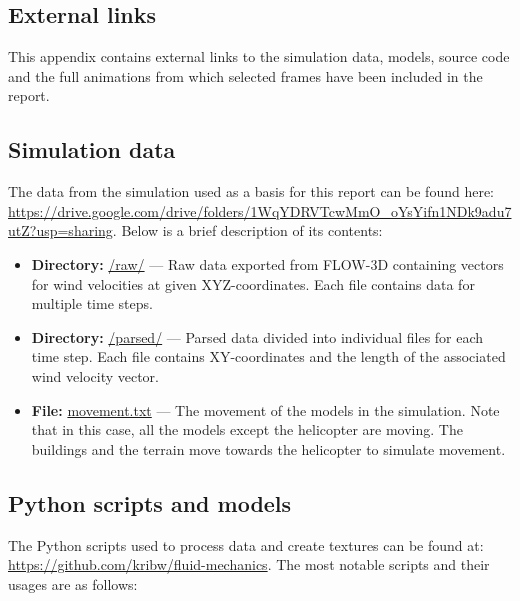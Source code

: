 \documentclass[a4paper,11pt]{extarticle}
\begin{document}

\pagebreak
\begin{appendices}

  \setcounter{figure}{0}
  \setcounter{table}{0}
  \setcounter{equation}{0}

  \renewcommand\thefigure{\thesection.\arabic{figure}}
  \renewcommand\thetable{\thesection.\arabic{table}}
  \renewcommand\theequation{\thesection.\arabic{equation}}

  \section{External links}
  This appendix contains external links to the simulation data, models, source code and the full animations from which selected frames have been included in the report.

  \subsection{Simulation data}\label{app:simdata}
  The data from the simulation used as a basis for this report can be found here: \url{https://drive.google.com/drive/folders/1WqYDRVTcwMmO_oYsYifn1NDk9adu7utZ?usp=sharing}. Below is a brief description of its contents:
  \begin{itemize}
    \item \textbf{Directory:} \url{/raw/} --- Raw data exported from FLOW-3D containing vectors for wind velocities at given XYZ-coordinates. Each file contains data for multiple time steps.
    \item \textbf{Directory:} \url{/parsed/} --- Parsed data divided into individual files for each time step. Each file contains XY-coordinates and the length of the associated wind velocity vector.
    \item \textbf{File:} \url{movement.txt} --- The movement of the models in the simulation. Note that in this case, all the models except the helicopter are moving. The buildings and the terrain move towards the helicopter to simulate movement.
  \end{itemize}

  \subsection{Python scripts and models}
  The Python scripts used to process data and create textures can be found at: \url{https://github.com/kribw/fluid-mechanics}. The most notable scripts and their usages are as follows:


\end{appendices}
\end{document}
